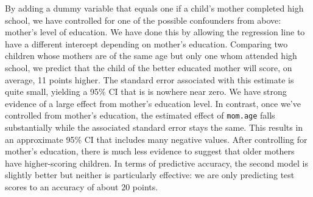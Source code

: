 \documentclass[addpoints,12pt]{exam}\usepackage[]{graphicx}\usepackage[]{color}
\newenvironment{knitrout}{}{} %
\begin{document}
\begin{questions}
\begin{parts}
\begin{solution}
\begin{knitrout}
\end{knitrout}
By adding a dummy variable that equals one if a child's mother completed high school, we have controlled for one of the possible confounders from above: mother's level of education. We have done this by allowing the regression line to have a different intercept depending on mother's education. Comparing two children whose mothers are of the same age but only one whom attended high school, we predict that the child of the better educated mother will score, on average, 11 points higher. The standard error associated with this estimate is quite small, yielding a 95\% CI that is is nowhere near zero. We have strong evidence of a large effect from mother's education level. In contrast, once we've controlled from mother's education, the estimated effect of \texttt{mom.age} falls substantially while the associated standard error stays the same. This results in an approximate 95\% CI that includes many negative values. After controlling for mother's education, there is much less evidence to suggest that older mothers have higher-scoring children. In terms of predictive accuracy, the second model is slightly better but neither is particularly effective: we are only predicting test scores to an accuracy of about 20 points.
    \end{solution}

\end{parts}
\end{questions}
\end{document}
